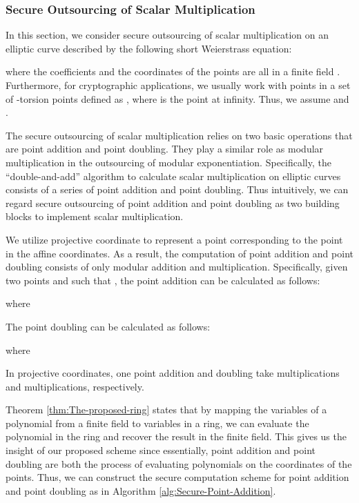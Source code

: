 \documentclass[english,draftcls,onecolumn,11pt]{IEEEtran}
\theoremstyle{definition}
\theoremstyle{plain}
\theoremstyle{plain}
\theoremstyle{definition}
\begin{document}
\subsubsection{Secure Outsourcing of Scalar Multiplication}

In this section, we consider secure outsourcing of scalar multiplication
 on an elliptic curve  described by the following
short Weierstrass equation: 


where the coefficients  and the coordinates of the points are
all in a finite field . Furthermore, for cryptographic
applications, we usually work with points in a set of -torsion
points  defined as ,
where  is the point at infinity. Thus, we assume 
and .

The secure outsourcing of scalar multiplication relies on two basic
operations that are point addition and point doubling. They play a
similar role as modular multiplication in the outsourcing of modular
exponentiation. Specifically, the ``double-and-add'' algorithm to
calculate scalar multiplication on elliptic curves consists of a series
of point addition and point doubling. Thus intuitively, we can regard
secure outsourcing of point addition and point doubling as two building
blocks to implement scalar multiplication.

We utilize projective coordinate to represent a point 
corresponding to the point 
in the affine coordinates. As a result, the computation of point addition
and point doubling consists of only modular addition and multiplication.
Specifically, given two points  and 
such that , the point addition 
can be calculated as follows:

where 

The point doubling  can be calculated as
follows:

where 

In projective coordinates, one point addition and doubling take 
multiplications and  multiplications, respectively. 

Theorem \ref{thm:The-proposed-ring} states that by mapping the variables
of a polynomial from a finite field to variables in a ring, we can
evaluate the polynomial in the ring and recover the result in the
finite field. This gives us the insight of our proposed scheme since
essentially, point addition and point doubling are both the process
of evaluating polynomials on the coordinates of the points. Thus,
we can construct the secure computation scheme for point addition
and point doubling as in Algorithm \ref{alg:Secure-Point-Addition}. 
\end{document}
